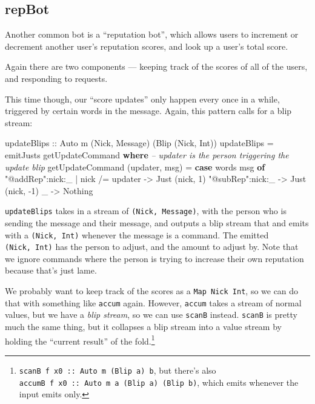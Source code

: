 \documentclass[]{article}
\newenvironment{Shaded}{}{}
\newcommand{\KeywordTok}[1]{\textcolor[rgb]{0.00,0.44,0.13}{\textbf{{#1}}}}
\newcommand{\DataTypeTok}[1]{\textcolor[rgb]{0.56,0.13,0.00}{{#1}}}
\newcommand{\DecValTok}[1]{\textcolor[rgb]{0.25,0.63,0.44}{{#1}}}
\newcommand{\StringTok}[1]{\textcolor[rgb]{0.25,0.44,0.63}{{#1}}}
\newcommand{\CommentTok}[1]{\textcolor[rgb]{0.38,0.63,0.69}{\textit{{#1}}}}
\newcommand{\OtherTok}[1]{\textcolor[rgb]{0.00,0.44,0.13}{{#1}}}
\newcommand{\FunctionTok}[1]{\textcolor[rgb]{0.02,0.16,0.49}{{#1}}}
\newcommand{\NormalTok}[1]{{#1}}
\begin{document}
\subsection{repBot}\label{repbot}

Another common bot is a ``reputation bot'', which allows users to
increment or decrement another user's reputation scores, and look up a
user's total score.

Again there are two components --- keeping track of the scores of all of
the users, and responding to requests.

This time though, our ``score updates'' only happen every once in a
while, triggered by certain words in the message. Again, this pattern
calls for a blip stream:

\begin{Shaded}
\begin{Highlighting}[]
\OtherTok{updateBlips ::} \DataTypeTok{Auto} \NormalTok{m (}\DataTypeTok{Nick}\NormalTok{, }\DataTypeTok{Message}\NormalTok{) (}\DataTypeTok{Blip} \NormalTok{(}\DataTypeTok{Nick}\NormalTok{, }\DataTypeTok{Int}\NormalTok{))}
\NormalTok{updateBlips }\FunctionTok{=} \NormalTok{emitJusts getUpdateCommand}
  \KeywordTok{where}
    \CommentTok{-- updater is the person triggering the update blip}
    \NormalTok{getUpdateCommand (updater, msg) }\FunctionTok{=}
      \KeywordTok{case} \NormalTok{words msg }\KeywordTok{of}
        \StringTok{"@addRep"}\FunctionTok{:}\NormalTok{nick}\FunctionTok{:}\NormalTok{_ }\FunctionTok{|} \NormalTok{nick }\FunctionTok{/=} \NormalTok{updater }\OtherTok{->} \DataTypeTok{Just} \NormalTok{(nick, }\DecValTok{1}\NormalTok{)}
        \StringTok{"@subRep"}\FunctionTok{:}\NormalTok{nick}\FunctionTok{:}\NormalTok{_                   }\OtherTok{->} \DataTypeTok{Just} \NormalTok{(nick, }\FunctionTok{-}\DecValTok{1}\NormalTok{)}
        \NormalTok{_                                  }\OtherTok{->} \DataTypeTok{Nothing}
\end{Highlighting}
\end{Shaded}

\texttt{updateBlips} takes in a stream of \texttt{(Nick,\ Message)},
with the person who is sending the message and their message, and
outputs a blip stream that and emits with a \texttt{(Nick,\ Int)}
whenever the message is a command. The emitted \texttt{(Nick,\ Int)} has
the person to adjust, and the amount to adjust by. Note that we ignore
commands where the person is trying to increase their own reputation
because that's just lame.

We probably want to keep track of the scores as a
\texttt{Map\ Nick\ Int}, so we can do that with something like
\texttt{accum} again. However, \texttt{accum} takes a stream of normal
values, but we have a \emph{blip stream}, so we can use \texttt{scanB}
instead. \texttt{scanB} is pretty much the same thing, but it collapses
a blip stream into a value stream by holding the ``current result'' of
the fold.\footnote{\texttt{scanB\ f\ x0\ ::\ Auto\ m\ (Blip\ a)\ b}, but
  there's also
  \texttt{accumB\ f\ x0\ ::\ Auto\ m\ a\ (Blip\ a)\ (Blip\ b)}, which
  emits whenever the input emits only.}
\end{document}
